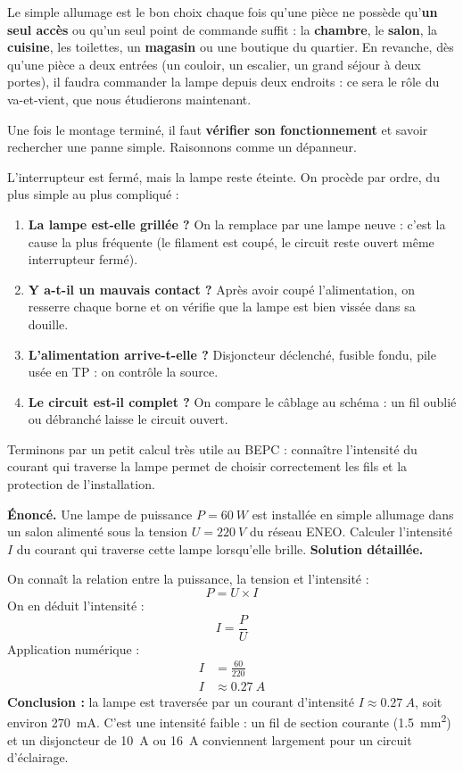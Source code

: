 \documentclass[11pt]{article}
\newcommand{\cle}[1]{{\popxbold\color{popdark}#1}}
\newcounter{popsec}
\newcounter{popsub}
\newcommand{\courssub}[1]{%
  \stepcounter{popsub}%
  \par\vspace{9pt}\noindent{\popxbold\fontsize{11.5}{13}\selectfont\color{popink}{\color{poporange}\thepopsec.\thepopsub}\hspace{6pt}#1}\par\nopagebreak\vspace{4pt}
}
\begin{document}
\courssub{Usages, vérification et dépannage}

Le simple allumage est le bon choix chaque fois qu'une pièce ne possède qu'\textbf{un seul accès} ou qu'un seul point de commande suffit : la \textbf{chambre}, le \textbf{salon}, la \textbf{cuisine}, les toilettes, un \textbf{magasin} ou une boutique du quartier. En revanche, dès qu'une pièce a deux entrées (un couloir, un escalier, un grand séjour à deux portes), il faudra commander la lampe depuis deux endroits : ce sera le rôle du \cle{va-et-vient}, que nous étudierons maintenant.

Une fois le montage terminé, il faut \textbf{vérifier son fonctionnement} et savoir rechercher une panne simple. Raisonnons comme un dépanneur.

\begin{exemplebox}
L'interrupteur est fermé, mais la lampe reste éteinte. On procède par ordre, du plus simple au plus compliqué :
\begin{enumerate}
\item \textbf{La lampe est-elle grillée ?} On la remplace par une lampe neuve : c'est la cause la plus fréquente (le filament est coupé, le circuit reste ouvert même interrupteur fermé).
\item \textbf{Y a-t-il un mauvais contact ?} Après avoir coupé l'alimentation, on resserre chaque borne et on vérifie que la lampe est bien vissée dans sa douille.
\item \textbf{L'alimentation arrive-t-elle ?} Disjoncteur déclenché, fusible fondu, pile usée en TP : on contrôle la source.
\item \textbf{Le circuit est-il complet ?} On compare le câblage au schéma : un fil oublié ou débranché laisse le circuit ouvert.
\end{enumerate}
\end{exemplebox}

Terminons par un petit calcul très utile au BEPC : connaître l'intensité du courant qui traverse la lampe permet de choisir correctement les fils et la protection de l'installation.

\begin{exoresolu}
\textbf{Énoncé.} Une lampe de puissance $P = \SI{60}{W}$ est installée en simple allumage dans un salon alimenté sous la tension $U = \SI{220}{V}$ du réseau ENEO. Calculer l'intensité $I$ du courant qui traverse cette lampe lorsqu'elle brille.
\tcblower
\textbf{Solution détaillée.}

On connaît la relation entre la puissance, la tension et l'intensité :
\[ P = U \times I \]
On en déduit l'intensité :
\[ I = \frac{P}{U} \]
Application numérique :
\begin{align*}
I &= \frac{60}{220} \\
I &\approx \SI{0,27}{A}
\end{align*}
\textbf{Conclusion :} la lampe est traversée par un courant d'intensité $I \approx \SI{0,27}{A}$, soit environ \SI{270}{mA}. C'est une intensité faible : un fil de section courante (\SI{1,5}{mm^{2}}) et un disjoncteur de \SI{10}{A} ou \SI{16}{A} conviennent largement pour un circuit d'éclairage.
\end{exoresolu}
\end{document}
